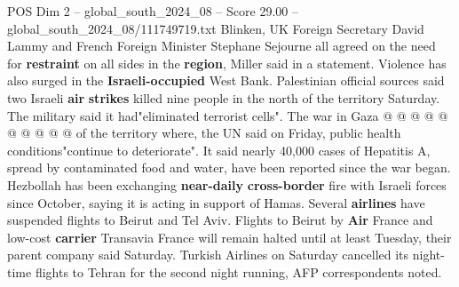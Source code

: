 \begin{textsample}{POS Dim 2 – global\_south\_2024\_08 – Score 29.00 – global\_south\_2024\_08/111749719.txt}
Blinken, UK Foreign Secretary David Lammy and French Foreign Minister Stephane Sejourne all agreed on the need for \textbf{restraint} on all sides in the \textbf{region}, Miller said in a statement.
Violence has also surged in the \textbf{Israeli-occupied} West Bank.
Palestinian official sources said two Israeli \textbf{air} \textbf{strikes} killed nine people in the north of the territory Saturday.
The military said it had"eliminated terrorist cells".
The war in Gaza @ @ @ @ @ @ @ @ @ @ of the territory where, the UN said on Friday, public health conditions"continue to deteriorate".
It said nearly 40,000 cases of Hepatitis A, spread by contaminated food and water, have been reported since the war began.
Hezbollah has been exchanging \textbf{near-daily} \textbf{cross-border} fire with Israeli forces since October, saying it is acting in support of Hamas.
Several \textbf{airlines} have suspended flights to Beirut and Tel Aviv.
Flights to Beirut by \textbf{Air} France and low-cost \textbf{carrier} Transavia France will remain halted until at least Tuesday, their parent company said Saturday.
Turkish Airlines on Saturday cancelled its night-time flights to Tehran for the second night running, AFP correspondents noted.

\end{textsample}
